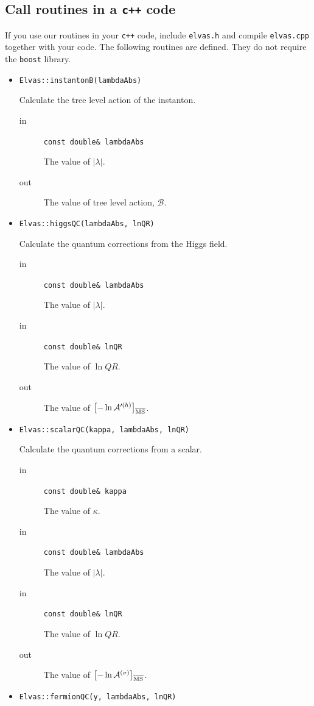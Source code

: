 \documentclass[12pt]{article}
\begin{document}
\subsection{Call routines in a {\tt c++} code}
If you use our routines in your
\verb|c++| code, include \verb|elvas.h| and compile \verb|elvas.cpp|
together with your code. The following routines are defined. They do not
require the \verb|boost| library.
\begin{itemize}
 \item \verb|Elvas::instantonB(lambdaAbs)|

Calculate the tree level action of the instanton.
\begin{description}
 \item[in] \verb|const double& lambdaAbs|

 The value of $|\lambda |$.
 \item[out] The value of tree level action, $\mathcal B$.
\end{description}
 \item \verb|Elvas::higgsQC(lambdaAbs, lnQR)|

Calculate the quantum corrections from the Higgs field.
\begin{description}
 \item[in] \verb|const double& lambdaAbs|

 The value of $|\lambda |$.
 \item[in] \verb|const double& lnQR|

 The value of $\ln Q R$.
 \item[out] The value of $\left[-\ln\mathcal A'^{(h)}\right]_{\rm \overline{MS}}$.
\end{description}
 \item \verb|Elvas::scalarQC(kappa, lambdaAbs, lnQR)|

Calculate the quantum corrections from a scalar.
\begin{description}
 \item[in] \verb|const double& kappa|

 The value of $\kappa$.
 \item[in] \verb|const double& lambdaAbs|

 The value of $|\lambda |$.
 \item[in] \verb|const double& lnQR|

 The value of $\ln Q R$.
 \item[out] The value of $\left[-\ln\mathcal A^{(\sigma)}\right]_{\rm \overline{MS}}$.
\end{description}
 \item \verb|Elvas::fermionQC(y, lambdaAbs, lnQR)|


\end{itemize}
\end{document}
